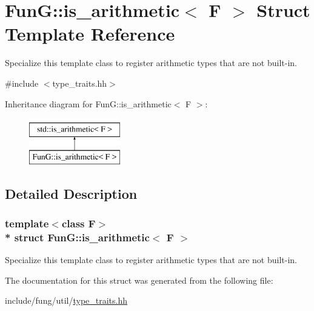 \hypertarget{structFunG_1_1is__arithmetic}{}\section{FunG\+:\+:is\+\_\+arithmetic$<$ F $>$ Struct Template Reference}
\label{structFunG_1_1is__arithmetic}


Specialize this template class to register arithmetic types that are not built-\/in.  




{\ttfamily \#include $<$type\+\_\+traits.\+hh$>$}

Inheritance diagram for FunG\+:\+:is\+\_\+arithmetic$<$ F $>$\+:\begin{figure}[H]
\begin{center}
\leavevmode
\includegraphics[height=2.000000cm]{structFunG_1_1is__arithmetic}
\end{center}
\end{figure}


\subsection{Detailed Description}
\subsubsection*{template$<$class F$>$\\*
struct Fun\+G\+::is\+\_\+arithmetic$<$ F $>$}

Specialize this template class to register arithmetic types that are not built-\/in. 

The documentation for this struct was generated from the following file\+:\begin{DoxyCompactItemize}
\item 
include/fung/util/\hyperlink{type__traits_8hh}{type\+\_\+traits.\+hh}\end{DoxyCompactItemize}
